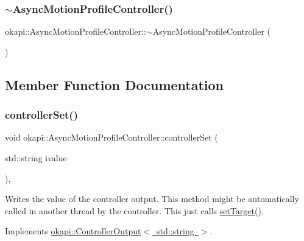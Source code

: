 \subsubsection{\texorpdfstring{$\sim$AsyncMotionProfileController()}{~AsyncMotionProfileController()}}
{\footnotesize\ttfamily okapi\+::\+Async\+Motion\+Profile\+Controller\+::$\sim$\+Async\+Motion\+Profile\+Controller (\begin{DoxyParamCaption}{ }\end{DoxyParamCaption})\hspace{0.3cm}{\ttfamily [override]}}



\subsection{Member Function Documentation}
\mbox{\label{classokapi_1_1AsyncMotionProfileController_a292b22f53ed0ef67a479e00c92f68e3f}} 
\subsubsection{\texorpdfstring{controllerSet()}{controllerSet()}}
{\footnotesize\ttfamily void okapi\+::\+Async\+Motion\+Profile\+Controller\+::controller\+Set (\begin{DoxyParamCaption}\item[{std\+::string}]{ivalue }\end{DoxyParamCaption})\hspace{0.3cm}{\ttfamily [override]}, {\ttfamily [virtual]}}

Writes the value of the controller output. This method might be automatically called in another thread by the controller. This just calls \mbox{\hyperlink{classokapi_1_1AsyncMotionProfileController_adf705d6bfd3d0a83d8a6c50a05ffd156}{set\+Target()}}. 

Implements \mbox{\hyperlink{classokapi_1_1ControllerOutput_a360c08f0c10b36f882d6d3100c2cad49}{okapi\+::\+Controller\+Output$<$ std\+::string $>$}}.

\mbox{\label{classokapi_1_1AsyncMotionProfileController_a74b2981453d36e01c30b66c522bdcb52}} 

